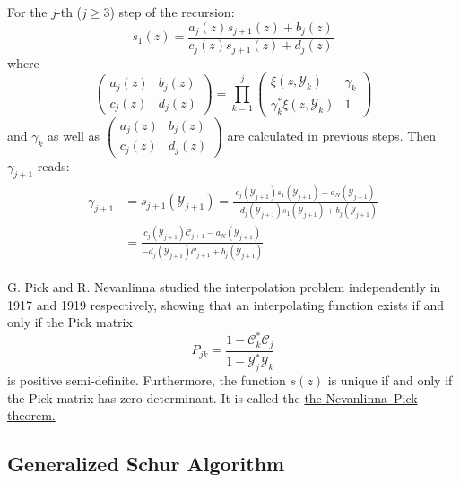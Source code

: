 \documentclass[
	preprint,%
	aps,
	prb,
	showpacs,	
	amsmath, amssymb]{revtex4-2}
\newcommand{\Y}{ {\mathcal{Y}} }
\newcommand{\C}{ {\mathcal{C}} }
\begin{document}
For the $j$-th ($j \geq 3$) step of the recursion:
\begin{equation}
	s_1(z) 
	= \frac{a_j(z) s_{j+1}(z) + b_j(z)}{c_j(z) s_{j+1}(z) + d_j(z)}
\end{equation}
where
\begin{equation}
	\left(
		\begin{matrix}
			a_j(z) & b_j(z) \\
			c_j(z) & d_j(z)
		\end{matrix}
	\right)
	= \prod_{k=1}^{j}
	\left(
		\begin{matrix}
			\xi(z, \Y_k)            & \gamma_k \\
			\gamma_k^* \xi(z, \Y_k) & 1
		\end{matrix}
	\right)
\end{equation}
and $\gamma_k$ as well as $	\left(
	\begin{matrix}
		a_j(z) & b_j(z) \\
		c_j(z) & d_j(z)
	\end{matrix}
\right)$ are calculated in previous steps. 
Then $\gamma_{j+1}$ reads:
\begin{align}
\begin{split}
	\gamma_{j+1} &= s_{j+1}(\Y_{j+1}) 
	= \frac{c_j(\Y_{j+1}) s_1(\Y_{j+1}) - a_N(\Y_{j+1})}
	{-d_j(\Y_{j+1}) s_1(\Y_{j+1}) + b_j(\Y_{j+1})} \\
	&= \frac{c_j(\Y_{j+1}) \C_{j+1} - a_N(\Y_{j+1})}
	{-d_j(\Y_{j+1}) \C_{j+1} + b_j(\Y_{j+1})}
\end{split}
\end{align}


G. Pick and R. Nevanlinna studied the interpolation problem 
independently in 1917\cite{Pick1917} and 1919\cite{nevanlinna1919uber} 
respectively, showing that an 
interpolating function exists if and only if the Pick matrix
\begin{equation}\label{eq:pick-matrix-origional}
	P_{jk} = \frac{1-\C_k^* \C_j}{1 - \Y_j^* \Y_k}
\end{equation}
is positive semi-definite. Furthermore, the function $s(z)$ is 
unique if and only if the Pick matrix has zero determinant. It 
is called the 
\href{https://en.wikipedia.org/wiki/Nevanlinna%E2%80%93Pick_interpolation}
	{the Nevanlinna–Pick theorem.}


\subsection{Generalized Schur Algorithm}
\label{subsec:generalized-schur-algorithm}
\end{document}
